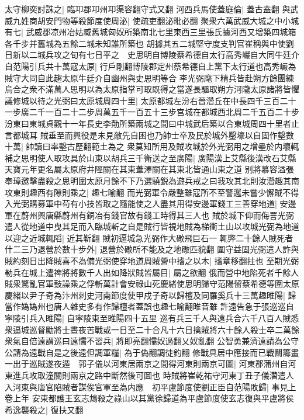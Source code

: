 太守柳奕討誅之|{
	臨卭郡卭州卭渠容翻守式又翻}
河西兵馬使蓋庭倫|{
	蓋古盍翻}
與武威九姓商胡安門物等殺節度使周泌|{
	使疏吏翻泌毗必翻}
聚衆六萬武威大城之中小城有七|{
	武威郡凉州冶姑臧舊城匈奴所築南北七里東西三里張氏據河西又增築四城箱各千步并舊城為五餘二城未知誰所築也}
胡據其五二城堅守度支判官崔稱與中使劉日新以二城兵攻之旬有七日平之　史思明自博陵蔡希德自太行高秀巗自大同牛廷介自范陽引兵共十萬寇太原|{
	行戶剛翻博陵郡定州蔡希德自上黨下太行道也高秀巗為賊守大同自此趨太原牛廷介自幽州與史思明等合}
李光弼麾下精兵皆赴朔方餘團練烏合之衆不滿萬人思明以為太原指掌可取既得之當遂長驅取朔方河隴太原諸將皆懼議修城以待之光弼曰太原城周四十里|{
	太原都城左汾右晉濳丘在中長四千三百二十一步廣二千一百二十二步周萬五千一百五十三步宫城在都城西北周二千五百二十步汾東曰東城貞觀十一年長史李勣所築兩城之間曰中城武后築以合東城周四十里者止言都城耳}
賊垂至而興役是未見敵先自困也乃帥士卒及民於城外鑿壕以自固作墼數十萬|{
	帥讀曰率墼古歷翻範土為之}
衆莫知所用及賊攻城於外光弼用之增壘於内壞輒補之思明使人取攻具於山東以胡兵三千衛送之至廣陽|{
	廣陽漢上艾縣後漢改石艾縣天寶元年更名屬太原府井陘關在其東葦澤關在其東北皆通山東之道}
别將慕容溢張奉璋邀擊盡殺之思明圍太原月餘不下乃選驍鋭為遊兵戒之曰我攻其北則汝濳趣其南攻東則趣西有隙則乘之|{
	趣七喻翻}
而光弼軍令嚴整雖寇所不至警邏未嘗少懈賊不得入光弼購募軍中苟有小技皆取之隨能使之人盡其用得安邊軍錢工三善穿地道|{
	安邊軍在蔚州興唐縣蔚州有銅冶有錢官故有錢工時得其三人也}
賊於城下仰而侮詈光弼遣人從地道中曳其足而入臨城斬之自是賊行皆視地賊為梯衝土山以攻城光弼為地道以迎之近城輒䧟|{
	近其靳翻}
賊初逼城急光弼作大礮飛巨石一輒弊二十餘人賊死者什二三乃退營於數十步外|{
	退營於礮所不能及之地礮匹貌翻}
圍守益固光弼遣人詐與賊約刻日出降賊喜不為備光弼使穿地道周賊營中搘之以木|{
	搘章移翻拄也}
至期光弼勒兵在城上遣禆將將數千人出如降狀賊皆屬目|{
	屬之欲翻}
俄而營中地陷死者千餘人賊衆驚亂官軍鼓譟乘之俘斬萬計會安祿山死慶緒使思明歸守范陽留蔡希德等圍太原　慶緒以尹子奇為汴州刺史河南節度使甲戍子奇以歸檀及同羅奚兵十三萬趣睢陽|{
	歸當作媯媯州也唐人雜史多有作歸檀者蓋誤也趣七喻翻睢音雖}
許遠告急于張巡巡自寜陵引兵入睢陽|{
	自寜陵東至睢陽四十五里}
巡有兵三千人與遠兵合六千八百人賊悉衆逼城巡督勵將士晝夜苦戰或一日至二十合凡十六日擒賊將六十餘人殺士卒二萬餘衆氣自倍遠謂巡曰遠懦不習兵|{
	將即亮翻懦奴過翻乂奴亂翻}
公智勇兼濟遠請為公守公請為遠戰自是之後遠但調軍糧|{
	為于偽翻調徒釣翻}
修戰具居中應接而已戰鬭籌畫一出于巡賊遂夜遁　郭子儀以河東居兩京之間得河東則兩京可圖|{
	河東郡蒲州自河東進兵攻取潼關則兩京之路中斷然後可圖也}
時賊將崔乾祐守河東丁丑子儀濳遣人入河東與唐官陷賊者謀俟官軍至為内應　初平盧節度使劉正臣自范陽敗歸|{
	事見上卷上年}
安東都護王玄志鴆殺之祿山以其黨徐歸道為平盧節度使玄志復與平盧將侯希逸襲殺之|{
	復扶又翻}
